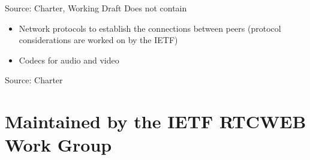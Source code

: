 Source: Charter, Working Draft
Does not contain
\begin{itemize}
\item Network protocols to establish the connections between peers (protocol considerations are worked on by the IETF)
\item Codecs for audio and video
\end{itemize}

Source: Charter

\section{Maintained by the IETF RTCWEB Work Group}


\todo{}